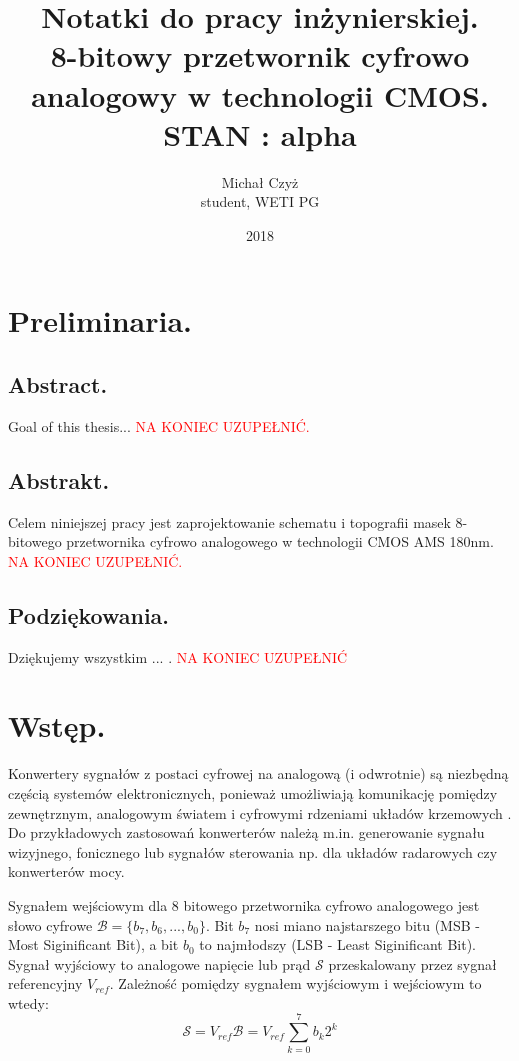 \documentclass[10pt,a4paper]{report}
\title{Notatki do pracy inżynierskiej. \\ 8-bitowy przetwornik cyfrowo analogowy w technologii CMOS. \\ STAN : alpha}
\date{2018}
\author{Michał Czyż \\ student, WETI PG}
\begin{document}
	\maketitle
	
	\tableofcontents
	\newpage
	\chapter{Preliminaria.}
	\section{Abstract.}
	{	Goal of this thesis... \textcolor{red}{NA KONIEC UZUPEŁNIĆ.} }

	\section{Abstrakt.}
	{	Celem niniejszej pracy jest zaprojektowanie schematu i topografii masek 8-bitowego przetwornika cyfrowo analogowego w technologii CMOS AMS 180nm. \textcolor{red}{NA KONIEC UZUPEŁNIĆ.} }
	
	\section{Podziękowania.}
	{	Dziękujemy wszystkim ... . \textcolor{red}{NA KONIEC UZUPEŁNIĆ} }
	
	\chapter{Wstęp.}
	{	Konwertery sygnałów z postaci cyfrowej na analogową (i odwrotnie) są niezbędną częścią systemów elektronicznych, ponieważ umożliwiają komunikację pomiędzy zewnętrznym, analogowym światem i cyfrowymi rdzeniami układów krzemowych \cite{integconv}. Do przykładowych zastosowań konwerterów należą m.in. generowanie sygnału wizyjnego, fonicznego lub sygnałów sterowania np. dla układów radarowych czy konwerterów mocy. }
	
	{	Sygnałem wejściowym dla 8 bitowego przetwornika cyfrowo analogowego jest słowo cyfrowe $\mathcal{B}=\{b_7,b_6,...,b_0\}$. Bit $b_7$ nosi miano najstarszego bitu (MSB - Most Siginificant Bit), a bit $b_0$ to najmłodszy (LSB - Least Siginificant Bit). Sygnał wyjściowy to analogowe napięcie lub prąd $\mathcal{S}$ przeskalowany przez sygnał referencyjny $V_{ref}$. Zależność pomiędzy sygnałem wyjściowym i wejściowym to wtedy:
	\begin{equation}
	\mathcal{S} = V_{ref}\mathcal{B} = V_{ref} {\sum_{k=0}^{7}b_k2^k}
	\end{equation}

	}
	
\end{document}
